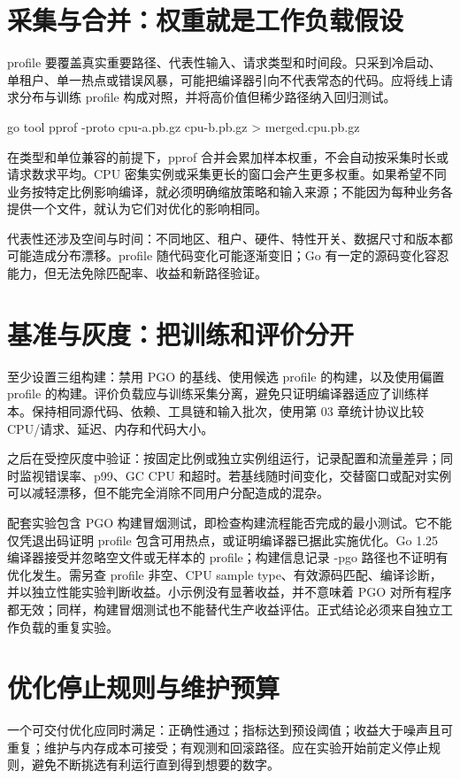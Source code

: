\documentclass[UTF8,fontset=fandol,openany,11pt]{ctexbook}
\begin{document}
\section{采集与合并：权重就是工作负载假设}
profile 要覆盖真实重要路径、代表性输入、请求类型和时间段。只采到冷启动、单租户、单一热点或错误风暴，可能把编译器引向不代表常态的代码。应将线上请求分布与训练 profile 构成对照，并将高价值但稀少路径纳入回归测试。

\begin{codeblock}
go tool pprof -proto cpu-a.pb.gz cpu-b.pb.gz > merged.cpu.pb.gz
\end{codeblock}

在类型和单位兼容的前提下，pprof 合并会累加样本权重，不会自动按采集时长或请求数求平均。CPU 密集实例或采集更长的窗口会产生更多权重。如果希望不同业务按特定比例影响编译，就必须明确缩放策略和输入来源；不能因为每种业务各提供一个文件，就认为它们对优化的影响相同。\cite{go-pgo}

代表性还涉及空间与时间：不同地区、租户、硬件、特性开关、数据尺寸和版本都可能造成分布漂移。profile 随代码变化可能逐渐变旧；Go 有一定的源码变化容忍能力，但无法免除匹配率、收益和新路径验证。

\section{基准与灰度：把训练和评价分开}
至少设置三组构建：禁用 PGO 的基线、使用候选 profile 的构建，以及使用偏置 profile 的构建。评价负载应与训练采集分离，避免只证明编译器适应了训练样本。保持相同源代码、依赖、工具链和输入批次，使用第 03 章统计协议比较 CPU/请求、延迟、内存和代码大小。

之后在受控灰度中验证：按固定比例或独立实例组运行，记录配置和流量差异；同时监视错误率、p99、GC CPU 和超时。若基线随时间变化，交替窗口或配对实例可以减轻漂移，但不能完全消除不同用户分配造成的混杂。

配套实验包含 PGO 构建冒烟测试，即检查构建流程能否完成的最小测试。它不能仅凭退出码证明 profile 包含可用热点，或证明编译器已据此实施优化。Go 1.25 编译器接受并忽略空文件或无样本的 profile；构建信息记录 -pgo 路径也不证明有优化发生。需另查 profile 非空、CPU sample type、有效源码匹配、编译诊断，并以独立性能实验判断收益。小示例没有显著收益，并不意味着 PGO 对所有程序都无效；同样，构建冒烟测试也不能替代生产收益评估。正式结论必须来自独立工作负载的重复实验。

\section{优化停止规则与维护预算}
一个可交付优化应同时满足：正确性通过；指标达到预设阈值；收益大于噪声且可重复；维护与内存成本可接受；有观测和回滚路径。应在实验开始前定义停止规则，避免不断挑选有利运行直到得到想要的数字。
\end{document}
